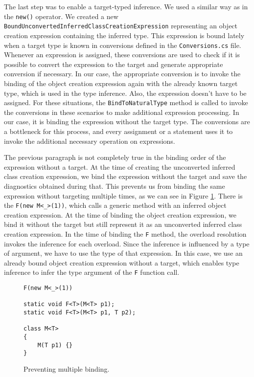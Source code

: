 \par
The last step was to enable a target-typed inference. 
We used a similar way as in the \texttt{new()} operator. We created a new\\ \texttt{BoundUnconvertedInferredClassCreationExpression} representing an object creation expression containing the inferred type. 
This expression is bound lately when a target type is known in conversions defined in the \texttt{Conversions.cs} file. 
Whenever an expression is assigned, these conversions are used to check if it is possible to convert the expression to the target and generate appropriate conversion if necessary. 
In our case, the appropriate conversion is to invoke the binding of the object creation expression again with the already known target type, which is used in the type inference. 
Also, the expression doesn’t have to be assigned. 
For these situations, the \texttt{BindToNaturalType} method is called to invoke the conversions in these scenarios to make additional expression processing. 
In our case, it is binding the expression without the target type. 
The conversions are a bottleneck for this process, and every assignment or a statement uses it to invoke the additional necessary operation on expressions.
\par
The previous paragraph is not completely true in the binding order of the expression without a target. 
At the time of creating the unconverted inferred class creation expression, we bind the expression without the target and save the diagnostics obtained during that. 
This prevents us from binding the same expression without targeting multiple times, as we can see in Figure \ref{img71:binding}. 
There is the \texttt{F(new M<\_>(1))}, which calls a generic method with an inferred object creation expression. 
At the time of binding the object creation expression, we bind it without the target but still represent it as an unconverted inferred class creation expression. 
In the time of binding the \texttt{F} method, the overload resolution invokes the inference for each overload.
Since the inference is influenced by a type of argument, we have to use the type of that expression.
In this case, we use an already bound object creation expression without a target, which enables type inference to infer the type argument of the \texttt{F} function call. 
\begin{figure}[h]
\begin{lstlisting}[style=csharp, showstringspaces=false]
F(new M<_>(1))

static void F<T>(M<T> p1);
static void F<T>(M<T> p1, T p2);

class M<T> 
{
    M(T p1) {}
}
\end{lstlisting}
\caption{Preventing multiple binding.}
\label{img71:binding}
\end{figure}
